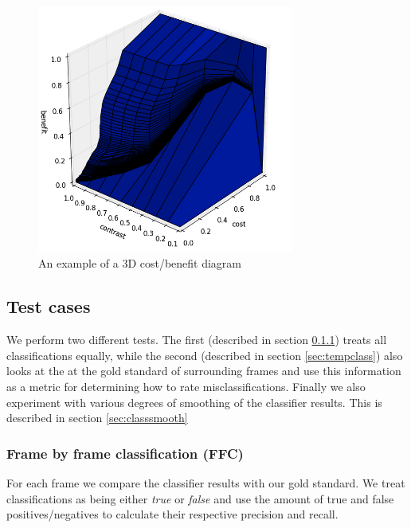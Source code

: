 %
\begin{figure}
     \centering
     \includegraphics[width=0.75\textwidth]{img/3dcostbenefitexample.jpg}
     \caption{An example of a 3D cost/benefit diagram}
     \label{fig:3dcostbenefitdiagram}
\end{figure}
%
\subsection{Test cases}\label{sec:testcases}
%
We perform two different tests. The first (described in section \ref{sec:fbfclass}) treats all classifications equally, while the second (described in section \ref{sec:tempclass}) also looks at the at the gold standard of surrounding frames and use this information as a metric for determining how to rate misclassifications. Finally we also experiment with various degrees of smoothing of the classifier results. This is described in section \ref{sec:classsmooth}
%
\subsubsection{Frame by frame classification (FFC)}\label{sec:fbfclass}
%
For each frame we compare the classifier results with our gold standard. We treat classifications as being either \textit{true} or \textit{false} and use the amount of true and false positives/negatives to calculate their respective precision and recall.
%
